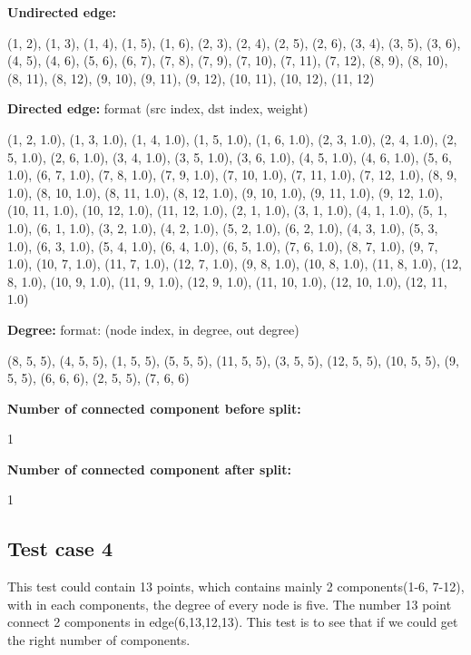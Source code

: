 \par \textbf{Undirected edge:}
\par (1, 2), (1, 3), (1, 4), (1, 5), (1, 6), (2, 3), (2, 4), (2, 5), (2, 6), (3, 4), (3, 5), (3, 6), (4, 5), (4, 6), (5, 6), (6, 7), (7, 8), (7, 9), (7, 10), (7, 11), (7, 12), (8, 9), (8, 10), (8, 11), (8, 12), (9, 10), (9, 11), (9, 12), (10, 11), (10, 12), (11, 12) \\

\par \textbf{Directed edge:}   format (src index, dst index, weight)
\par (1, 2, 1.0), (1, 3, 1.0), (1, 4, 1.0), (1, 5, 1.0), (1, 6, 1.0), (2, 3, 1.0), (2, 4, 1.0), (2, 5, 1.0), (2, 6, 1.0), (3, 4, 1.0), (3, 5, 1.0), (3, 6, 1.0), (4, 5, 1.0), (4, 6, 1.0), (5, 6, 1.0), (6, 7, 1.0), (7, 8, 1.0), (7, 9, 1.0), (7, 10, 1.0), (7, 11, 1.0), (7, 12, 1.0), (8, 9, 1.0), (8, 10, 1.0), (8, 11, 1.0), (8, 12, 1.0), (9, 10, 1.0), (9, 11, 1.0), (9, 12, 1.0), (10, 11, 1.0), (10, 12, 1.0), (11, 12, 1.0), (2, 1, 1.0), (3, 1, 1.0), (4, 1, 1.0), (5, 1, 1.0), (6, 1, 1.0), (3, 2, 1.0), (4, 2, 1.0), (5, 2, 1.0), (6, 2, 1.0), (4, 3, 1.0), (5, 3, 1.0), (6, 3, 1.0), (5, 4, 1.0), (6, 4, 1.0), (6, 5, 1.0), (7, 6, 1.0), (8, 7, 1.0), (9, 7, 1.0), (10, 7, 1.0), (11, 7, 1.0), (12, 7, 1.0), (9, 8, 1.0), (10, 8, 1.0), (11, 8, 1.0), (12, 8, 1.0), (10, 9, 1.0), (11, 9, 1.0), (12, 9, 1.0), (11, 10, 1.0), (12, 10, 1.0), (12, 11, 1.0) \\

\par \textbf{Degree:}   format: (node index, in degree, out degree)
\par (8, 5, 5), (4, 5, 5), (1, 5, 5), (5, 5, 5), (11, 5, 5), (3, 5, 5), (12, 5, 5), (10, 5, 5), (9, 5, 5), (6, 6, 6), (2, 5, 5), (7, 6, 6) \\

\par \textbf{Number of connected component before split:}
\par 1\\
\par \textbf{Number of connected component after split:}
\par 1\\

\subsection{Test case 4}
\par This test could contain 13 points, which contains mainly 2 components(1-6, 7-12), with in each components, the degree of every node is five. The number 13 point connect 2 components in edge(6,13,12,13). This test is to see that if we could get the right number of components.  \\

